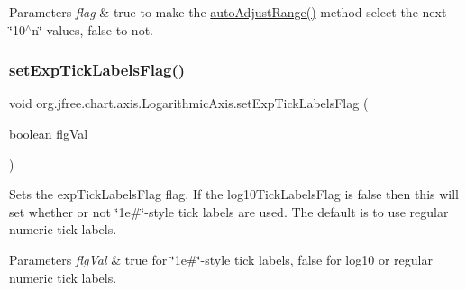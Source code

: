 \begin{DoxyParams}{Parameters}
{\em flag} & {\ttfamily true} to make the \textquotesingle{}\mbox{\hyperlink{classorg_1_1jfree_1_1chart_1_1axis_1_1_logarithmic_axis_a0f54dfcb35d307b607012249d644b4a3}{auto\+Adjust\+Range()}}\textquotesingle{} method select the next \char`\"{}10$^\wedge$n\char`\"{} values, {\ttfamily false} to not. \\
\hline
\end{DoxyParams}
\mbox{\label{classorg_1_1jfree_1_1chart_1_1axis_1_1_logarithmic_axis_a6562e919942bb471ade9996b2384c60c}} 
\subsubsection{\texorpdfstring{set\+Exp\+Tick\+Labels\+Flag()}{setExpTickLabelsFlag()}}
{\footnotesize\ttfamily void org.\+jfree.\+chart.\+axis.\+Logarithmic\+Axis.\+set\+Exp\+Tick\+Labels\+Flag (\begin{DoxyParamCaption}\item[{boolean}]{flg\+Val }\end{DoxyParamCaption})}

Sets the \textquotesingle{}exp\+Tick\+Labels\+Flag\textquotesingle{} flag. If the \textquotesingle{}log10\+Tick\+Labels\+Flag\textquotesingle{} is false then this will set whether or not \char`\"{}1e\#\char`\"{}-\/style tick labels are used. The default is to use regular numeric tick labels.


\begin{DoxyParams}{Parameters}
{\em flg\+Val} & true for \char`\"{}1e\#\char`\"{}-\/style tick labels, false for log10 or regular numeric tick labels. \\
\hline
\end{DoxyParams}
\mbox{\label{classorg_1_1jfree_1_1chart_1_1axis_1_1_logarithmic_axis_a6823066184b31fc84b3a136c22fadcd8}} 
